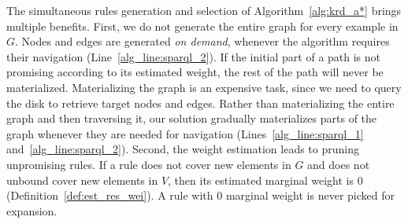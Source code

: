 

The simultaneous rules generation and selection of Algorithm~\ref{alg:krd_a*} brings multiple benefits. First, we do not generate the entire graph for every example in $G$. Nodes and edges are generated \emph{on demand}, whenever the algorithm requires their navigation (Line~\ref{alg_line:sparql_2}). If the initial part of a path is not promising according to its estimated weight, the rest of the path will never be materialized. %
Materializing the graph is an expensive task, since we need to query the disk to retrieve target nodes and edges. Rather than materializing the entire graph and then traversing it, our solution gradually materializes parts of the graph whenever they are needed for navigation (Lines~\ref{alg_line:sparql_1} and~\ref{alg_line:sparql_2}). 
Second, the weight estimation leads to pruning unpromising rules. If a rule does not cover new elements in $G$ and does not unbound cover new elements in $V$, then its estimated marginal weight is $0$ (Definition~\ref{def:est_res_wei}). A rule with $0$ marginal weight is never picked for expansion.






